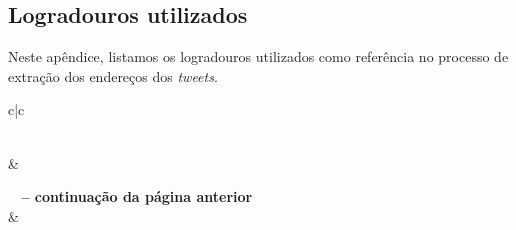 \documentclass[
	12pt,				%
	oneside,			%
	a4paper,			%
	english,			%
	brazil				%
	]{abntex2ppgsi}
\begin{document}
{{\begin{apendicesenv}
\clearpage

\chapter{Logradouros utilizados}
\label{apendiceB}

Neste apêndice, listamos os logradouros utilizados como referência no processo de extração dos endereços dos \textit{tweets}.

\begin{longtable}{c|c}
\caption{Tabela de logradouros com abreviaturas}
\label{tab:logradouros}\\

\hline {} &  \\ \hline 
\endfirsthead

%
{{\bfseries \tablename\ \thetable{} -- continuação da página anterior}} \\
\hline {} &   \\ \hline 
\endhead

\hline {} \\
\endfoot

\hline \hline
\endlastfoot


\end{longtable}
\end{apendicesenv}}}
\end{document}
